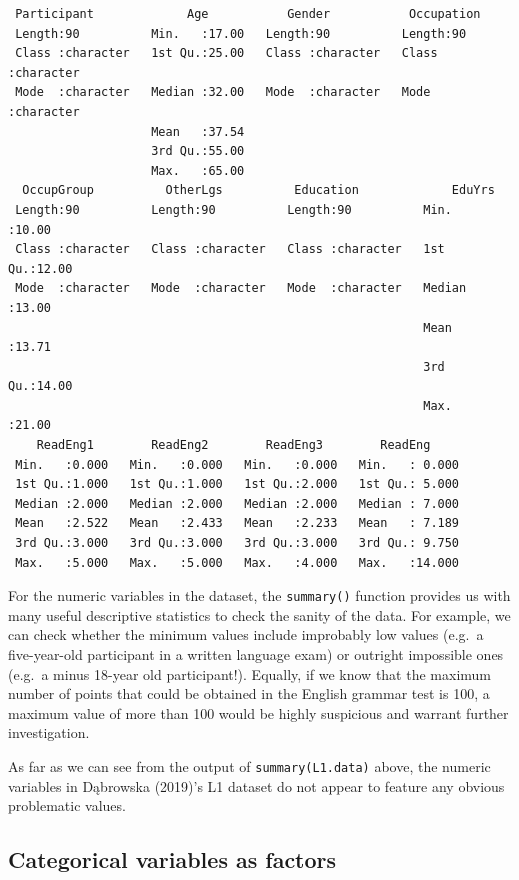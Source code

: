 \documentclass[
  letterpaper,
  DIV=11,
  numbers=noendperiod]{scrreprt}
\begin{document}
\begin{verbatim}
 Participant             Age           Gender           Occupation       
 Length:90          Min.   :17.00   Length:90          Length:90         
 Class :character   1st Qu.:25.00   Class :character   Class :character  
 Mode  :character   Median :32.00   Mode  :character   Mode  :character  
                    Mean   :37.54                                        
                    3rd Qu.:55.00                                        
                    Max.   :65.00                                        
  OccupGroup          OtherLgs          Education             EduYrs     
 Length:90          Length:90          Length:90          Min.   :10.00  
 Class :character   Class :character   Class :character   1st Qu.:12.00  
 Mode  :character   Mode  :character   Mode  :character   Median :13.00  
                                                          Mean   :13.71  
                                                          3rd Qu.:14.00  
                                                          Max.   :21.00  
    ReadEng1        ReadEng2        ReadEng3        ReadEng      
 Min.   :0.000   Min.   :0.000   Min.   :0.000   Min.   : 0.000  
 1st Qu.:1.000   1st Qu.:1.000   1st Qu.:2.000   1st Qu.: 5.000  
 Median :2.000   Median :2.000   Median :2.000   Median : 7.000  
 Mean   :2.522   Mean   :2.433   Mean   :2.233   Mean   : 7.189  
 3rd Qu.:3.000   3rd Qu.:3.000   3rd Qu.:3.000   3rd Qu.: 9.750  
 Max.   :5.000   Max.   :5.000   Max.   :4.000   Max.   :14.000  
\end{verbatim}

For the numeric variables in the dataset, the \texttt{summary()}
function provides us with many useful descriptive statistics to check
the sanity of the data. For example, we can check whether the minimum
values include improbably low values (e.g.~a five-year-old participant
in a written language exam) or outright impossible ones (e.g.~a minus
18-year old participant!). Equally, if we know that the maximum number
of points that could be obtained in the English grammar test is 100, a
maximum value of more than 100 would be highly suspicious and warrant
further investigation.

As far as we can see from the output of \texttt{summary(L1.data)} above,
the numeric variables in Dąbrowska (2019)'s L1 dataset do not appear to
feature any obvious problematic values.

\subsection{Categorical variables as factors}\label{sec-Factors}
\end{document}
